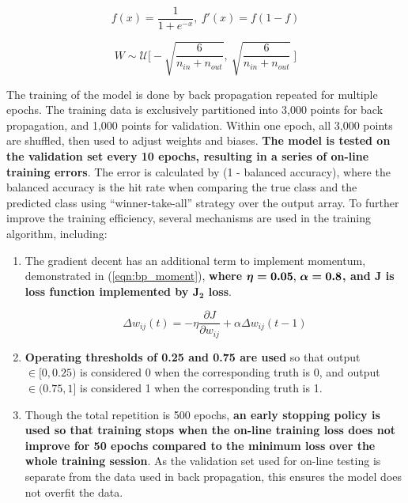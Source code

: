 \documentclass[11pt,titlepage]{article}
\begin{document}
\begin{equation}
	f(x) = \frac{1}{1+e^{-x}}, \  f'(x) = f(1-f)
	\label{eqn:sigmoid}
\end{equation}

\begin{equation}
	W \sim \mathcal{U} \bigg[  -\sqrt{\frac{6}{n_{in}+n_{out}}} , \  \sqrt{\frac{6}{n_{in}+n_{out}}} \ \bigg]
	\label{eqn:xavier}
\end{equation}

The training of the model is done by back propagation repeated for multiple epochs. The training data is exclusively partitioned into 3,000 points for back propagation, and 1,000 points for validation. Within one epoch, all 3,000 points are shuffled, then used to adjust weights and biases. \textbf{The model is tested on the validation set every 10 epochs, resulting in a series of on-line training errors}. The error is calculated by (1 - balanced accuracy), where the balanced accuracy is the hit rate when comparing the true class and the predicted class using ``winner-take-all'' strategy over the output array. To further improve the training efficiency, several mechanisms are used in the training algorithm, including:
\begin{enumerate}[label=\alph*.]
	\item The gradient decent has an additional term to implement momentum, demonstrated in (\ref{eqn:bp_moment}), \textbf{where $\boldsymbol{\eta = 0.05$, $\alpha = 0.8}$, and $\boldsymbol{J}$ is loss function implemented by $\boldsymbol{J_2}$ loss}. 

	\begin{equation}
		\Delta w_{ij}(t) = -\eta \frac{\partial J}{\partial w_{ij}} + \alpha \Delta w_{ij} (t-1)
		\label{eqn:bp_moment}
	\end{equation}
	
	\item \textbf{Operating thresholds of 0.25 and 0.75 are used} so that output $\in [0, 0.25)$ is considered 0 when the corresponding truth is 0, and output $\in (0.75, 1]$ is considered 1 when the corresponding truth is 1. 
	
	\item Though the total repetition is 500 epochs, \textbf{an early stopping policy is used so that training stops when the on-line training loss does not improve for 50 epochs compared to the minimum loss over the whole training session}. As the validation set used for on-line testing is separate from the data used in back propagation, this ensures the model does not overfit the data. 
\end{enumerate}
\end{document}
